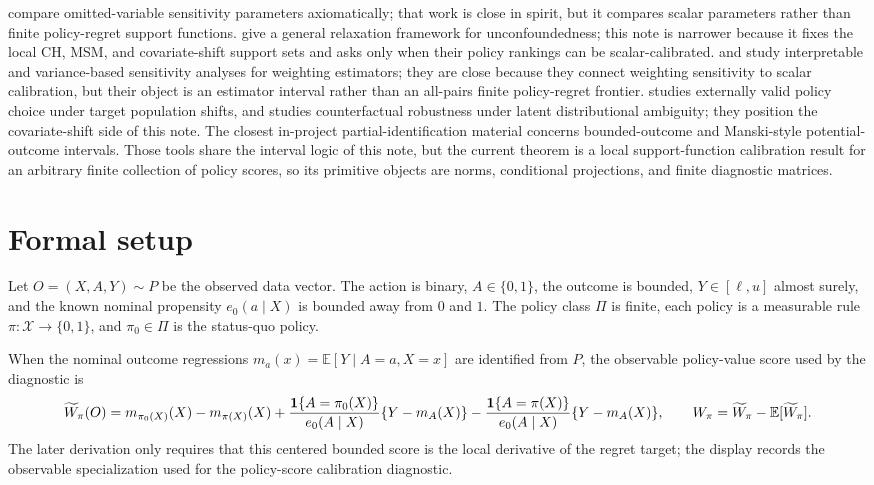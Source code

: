 \documentclass[11pt]{article}
\newcommand{\E}{\mathbb{E}}
\newcommand{\one}{\mathbf{1}}
\theoremstyle{definition}
\theoremstyle{plain}
\theoremstyle{remark}
\begin{document}
\cite{DiegertMastenPoirier2025} compare omitted-variable sensitivity parameters
axiomatically; that work is close in spirit, but it compares scalar parameters rather
than finite policy-regret support functions.  \cite{MastenPoirierRen2025} give a
general relaxation framework for unconfoundedness; this note is narrower because it
fixes the local CH, MSM, and covariate-shift support sets and asks only when their
policy rankings can be scalar-calibrated.  \cite{SorianoBenMichaelBickelFellerPimentel2023} and \cite{HuangPimentel2025} study
interpretable and variance-based sensitivity analyses for weighting estimators; they
are close because they connect weighting sensitivity to scalar calibration, but their
object is an estimator interval rather than an all-pairs finite policy-regret frontier.
\cite{AdjahoChristensen2025} studies externally valid policy choice under target
population shifts, and \cite{ChristensenConnault2023} studies counterfactual robustness
under latent distributional ambiguity; they position the covariate-shift side of this
note.  The closest in-project partial-identification material concerns bounded-outcome
and Manski-style potential-outcome intervals.  Those tools share the interval logic of
this note, but the current theorem is a local support-function calibration result for
an arbitrary finite collection of policy scores, so its primitive objects are norms,
conditional projections, and finite diagnostic matrices.

\section{Formal setup}
Let $O=(X,A,Y)\sim P$ be the observed data vector.  The action is binary,
$A\in\{0,1\}$, the outcome is bounded, $Y\in[\ell,u]$ almost surely, and the
known nominal propensity $e_0(a\mid X)$ is bounded away from $0$ and $1$.  The
policy class $\Pi$ is finite, each policy is a measurable rule
$\pi:\mathcal X\to\{0,1\}$, and $\pi_0\in\Pi$ is the status-quo policy.

When the nominal outcome regressions $m_a(x)=\E[Y\mid A=a,X=x]$ are identified from
$P$, the observable policy-value score used by the diagnostic is
\[
  \widetilde W_\pi(O)
  =
  m_{\pi_0(X)}(X)-m_{\pi(X)}(X)
  + {\one\{A=\pi_0(X)\}\over e_0(A\mid X)}\{Y-m_A(X)\}
  - {\one\{A=\pi(X)\}\over e_0(A\mid X)}\{Y-m_A(X)\},
  \qquad
  W_\pi=\widetilde W_\pi-\E[\widetilde W_\pi].
\]
The later derivation only requires that this centered bounded score is the local
derivative of the regret target; the display records the observable specialization
used for the policy-score calibration diagnostic.
\end{document}
